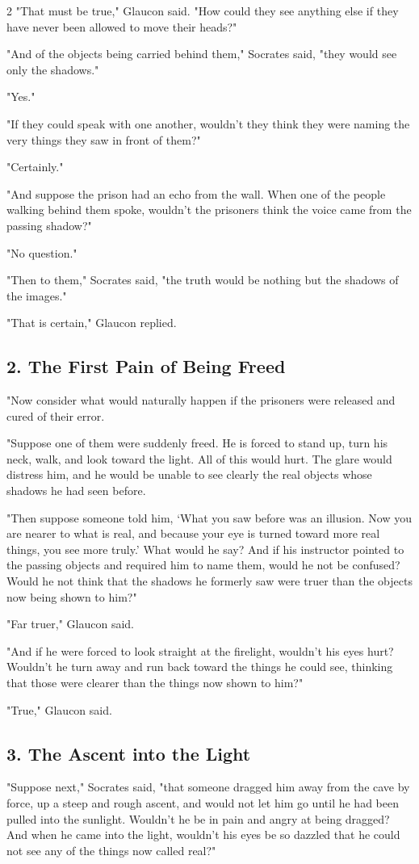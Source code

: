 \documentclass[12pt]{article}
\begin{document}
\begin{multicols}{2}
"That must be true," Glaucon said. "How could they see anything else if they have never been allowed to move their heads?"

"And of the objects being carried behind them," Socrates said, "they would see only the shadows."

"Yes."

"If they could speak with one another, wouldn't they think they were naming the very things they saw in front of them?"

"Certainly."

"And suppose the prison had an echo from the wall. When one of the people walking behind them spoke, wouldn't the prisoners think the voice came from the passing shadow?"

"No question."

"Then to them," Socrates said, "the truth would be nothing but the shadows of the images."

"That is certain," Glaucon replied.

\subsection*{2. The First Pain of Being Freed}
"Now consider what would naturally happen if the prisoners were released and cured of their error.

"Suppose one of them were suddenly freed. He is forced to stand up, turn his neck, walk, and look toward the light. All of this would hurt. The glare would distress him, and he would be unable to see clearly the real objects whose shadows he had seen before.

"Then suppose someone told him, `What you saw before was an illusion. Now you are nearer to what is real, and because your eye is turned toward more real things, you see more truly.' What would he say? And if his instructor pointed to the passing objects and required him to name them, would he not be confused? Would he not think that the shadows he formerly saw were truer than the objects now being shown to him?"

"Far truer," Glaucon said.

"And if he were forced to look straight at the firelight, wouldn't his eyes hurt? Wouldn't he turn away and run back toward the things he could see, thinking that those were clearer than the things now shown to him?"

"True," Glaucon said.

\subsection*{3. The Ascent into the Light}
"Suppose next," Socrates said, "that someone dragged him away from the cave by force, up a steep and rough ascent, and would not let him go until he had been pulled into the sunlight. Wouldn't he be in pain and angry at being dragged? And when he came into the light, wouldn't his eyes be so dazzled that he could not see any of the things now called real?"


\end{multicols}
\end{document}
